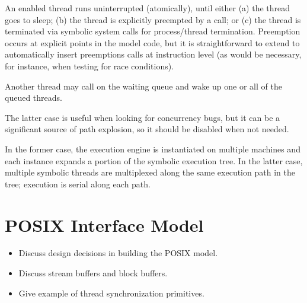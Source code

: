   An enabled thread runs uninterrupted (atomically), until either (a) the thread goes to sleep; (b) the thread is explicitly preempted by a  call; or (c) the thread is terminated via symbolic system calls for process/thread termination. Preemption occurs at explicit points in the model code, but it is straightforward to extend \cnine to automatically insert preemptions calls at instruction level (as would be necessary, for instance, when testing for race conditions).

  Another thread may call  on the waiting queue and wake up one or all of the queued threads.

 The latter case is useful when looking for concurrency bugs, but it can be a significant source of path explosion, so it should be disabled when not needed.


 In the former case, the execution engine is instantiated on multiple machines and each instance expands a portion of the symbolic execution tree. In the latter case, multiple symbolic threads are multiplexed along the same execution path in the tree; execution is serial along each path.


\section{POSIX Interface Model}

\begin{itemize}
\item Discuss design decisions in building the POSIX model.
\item Discuss stream buffers and block buffers.
\item Give example of thread synchronization primitives.
\end{itemize}

